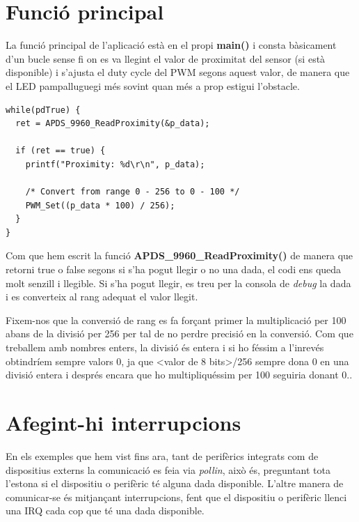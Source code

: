 \section{Funció principal}
La funció principal de l'aplicació està en el propi {\bf main()} i consta bàsicament d'un bucle sense fi on es va llegint el valor de proximitat del sensor (si està disponible) i s'ajusta el \gls{duty cycle} del \gls{PWM} segons aquest valor, de manera que el LED pampalluguegi més sovint quan més a prop estigui l'obstacle.

\begin{lstlisting}[caption={Funció principal},style=customc,label=ProximityExample]
while(pdTrue) {
  ret = APDS_9960_ReadProximity(&p_data);

  if (ret == true) {
    printf("Proximity: %d\r\n", p_data);

    /* Convert from range 0 - 256 to 0 - 100 */
    PWM_Set((p_data * 100) / 256);
  }
}
\end{lstlisting}

Com que hem escrit la funció {\bf APDS\_9960\_ReadProximity()} de manera que retorni true o false segons si s'ha pogut llegir o no una dada, el codi ens queda molt senzill i llegible. Si s'ha pogut llegir, es treu per la consola de {\em debug} la dada i es converteix al rang adequat el valor llegit.

\begin{remark}
 Fixem-nos que la conversió de rang es fa forçant primer la multiplicació per 100 abans de la divisió per 256 per tal de no perdre precisió en la conversió. Com que treballem amb nombres enters, la divisió és entera i si ho féssim a l'inrevés obtindríem sempre valors 0, ja que <valor de 8 bits>/256 sempre dona 0 en una divisió entera i després encara que ho multipliquéssim per 100 seguiria donant 0..
\end{remark}


\section{Afegint-hi interrupcions}
\label{sec:full_app_irq}
En els exemples que hem vist fins ara, tant de perifèrics integrats com de dispositius externs la comunicació es feia via {\em pollin}, això és, preguntant tota l'estona si el dispositiu o perifèric té alguna dada disponible. L'altre manera de comunicar-se és mitjançant interrupcions, fent que el dispositiu o perifèric llenci una \gls{IRQ} cada cop que té una dada disponible.

